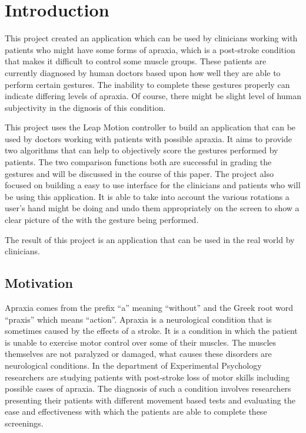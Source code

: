 \chapter{Introduction}

\label{Chapter1_introduction} 

This project created an application which can be used by clinicians working with patients who might have some forms of apraxia, which is a post-stroke condition that makes it difficult to control some muscle groups. These patients are currently diagnosed by human doctors based upon how well they are able to perform certain gestures. The inability to complete these gestures properly can indicate differing levels of apraxia. Of course, there might be slight level of human subjectivity in the dignosis of this condition. 

This project uses the Leap Motion controller to build an application that can be used by doctors working with patients with possible apraxia. It aims to provide two algorithms that can help to objectively score the gestures performed by patients. The two comparison functions both are successful in grading the gestures and will be discussed in the course of this paper. The project also focused on building a easy to use interface for the clinicians and patients who will be using this application. It is able to take into account the various rotations a user's hand might be doing and undo them appropriately on the screen to show a clear picture of the with the gesture being performed. 

The result of this project is an application that can be used in the real world by clinicians.


\section{Motivation}
Apraxia comes from the prefix “a” meaning “without” and the  Greek root word “praxis” which means “action”. Apraxia is a neurological condition that is sometimes caused by the effects of a stroke. It is a condition in which the patient is unable to exercise motor control over some of their muscles. The muscles themselves are not paralyzed or damaged, what causes these disorders are neurological conditions. In the department of Experimental Psychology researchers are studying patients with post-stroke loss of motor skills including possible cases of apraxia. The diagnosis of such a condition involves researchers presenting their patients with different movement based tests and evaluating the ease and effectiveness with which the patients are able to complete these screenings.  
	
